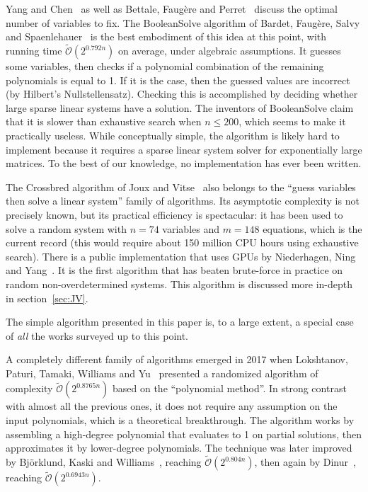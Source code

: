 \documentclass[twoside,leqno]{article}
\newcommand{\bigOsoft}[1]{\ensuremath{\mathcal{\tilde O}\left( #1 \right)} }
\begin{document}
Yang and Chen~\cite{YangC04} as well as Bettale, Faugère and
Perret~\cite{BettaleFP09} discuss the optimal number of variables to fix. The
\textsf{BooleanSolve} algorithm of Bardet, Faugère, Salvy and
Spaenlehauer~\cite{BardetFSS13} is the best embodiment of this idea at this
point, with running time $\bigOsoft{2^{0.792n}}$ on average, under algebraic
assumptions. It guesses some variables, then checks if a polynomial combination
of the remaining polynomials is equal to 1. If it is the case, then the guessed
values are incorrect (by Hilbert's Nullstellensatz). Checking this is
accomplished by deciding whether large sparse linear systems have a
solution. The inventors of \textsf{BooleanSolve} claim that it is slower than
exhaustive search when $n \leq 200$, which seems to make it practically
useless. While conceptually simple, the algorithm is likely hard to implement
because it requires a sparse linear system solver for exponentially large
matrices. To the best of our knowledge, no implementation has ever been
written.

The \textsf{Crossbred} algorithm of Joux and Vitse~\cite{JouxV17} also belongs
to the ``guess variables then solve a linear system'' family of algorithms. Its
asymptotic complexity is not precisely known, but its practical efficiency is
spectacular: it has been used to solve a random system with $n = 74$ variables
and $m=148$ equations, which is the current record (this would require about 150
million CPU hours using exhaustive search). There is a public implementation
that uses GPUs by Niederhagen, Ning and Yang~\cite{NiederhagenNY18}. It is the
first algorithm that has beaten brute-force in practice on random
non-overdetermined systems. This algorithm is discussed more in-depth in
section~\ref{sec:JV}.

The simple algorithm presented in this paper is, to a large extent, a special
case of \emph{all} the works surveyed up to this point.

A completely different family of algorithms emerged in 2017 when Lokshtanov,
Paturi, Tamaki, Williams and Yu~\cite{LokshtanovPTWY17} presented a randomized
algorithm of complexity $\bigOsoft{2^{0.8765n}}$ based on the ``polynomial
method''. In strong contrast with almost all the previous ones, it does not
require any assumption on the input polynomials, which is a theoretical
breakthrough. The algorithm works by assembling a high-degree polynomial that
evaluates to 1 on partial solutions, then approximates it by lower-degree
polynomials. The technique was later improved by Björklund, Kaski and
Williams~\cite{BjorklundK019}, reaching $\bigOsoft{2^{0.804n}}$, then again by
Dinur~\cite{Dinur21}, reaching $\bigOsoft{2^{0.6943n}}$.
\end{document}
